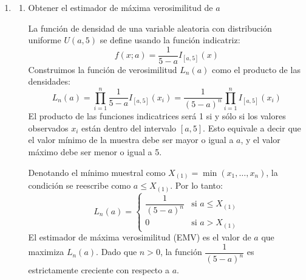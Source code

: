 \begin{enumerate}[label=\color{red}\textbf{\arabic*)}]
\begin{enumerate}[label=\arabic*)]
		            Para encontrar el máximo de esta función, calculamos la derivada de la log-verosimilitud con respecto al parámetro $\theta$ y la igualamos a cero: \[
			            \frac{\partial }{\partial \theta} \ln L_n(\theta)=\dfrac{n}{\theta}-\sum_{i=1}^{n} \ln(1+x_i)=0
		            \]
		            Despejamos $\theta$: \[
			            \dfrac{n}{\theta}=\sum_{i=1}^{n} \ln(1+x_i)
		            \]
		            Invertimos la expresión o pasamos $\theta$ multiplicando y la suma dividiendo: \[
			            \theta=\dfrac{n}{\sum_{i=1}^{n} \ln(1+x_i)}
		            \]
	      \end{enumerate}
	      \textbf{Conclusión}

	      Por lo tanto, el estimador de máxima verosimilitud para el parámetro $\theta$ es: \[
		      \hat{\theta}_{EMV}=\dfrac{n}{\sum_{i=1}^{n} \ln(1+X_i)}
	      \]

	\item {}
	      \begin{enumerate}[label=\arabic*)]
		      \item Obtener el estimador de máxima verosimilitud de $a$

		            La función de densidad de una variable aleatoria con distribución uniforme $U(a,5)$ se define usando la función indicatriz: \[
			            f(x;a)=\dfrac{1}{5-a}I_{[a,5]}(x)
		            \]
		            Construimos la función de verosimilitud $L_n(a)$ como el producto de las densidades: \[
			            L_n(a)=\prod_{i=1}^{n} \dfrac{1}{5-a}I_{[a,5]}(x_i)=\dfrac{1}{(5-a)^n}\prod_{i=1}^{n} I_{[a,5]}(x_i)
		            \]
		            El producto de las funciones indicatrices será 1 si y sólo si los valores observados $x_i$ están dentro del intervalo $[a,5]$. Esto equivale a decir que el valor mínimo de la muestra debe ser mayor o igual a $a$, y el valor máximo debe ser menor o igual a 5.

		            Denotando el mínimo muestral como $X_{(1)}=\min(x_1,\dots,x_n)$, la condición se reescribe como $a\le X_{(1)}$. Por lo tanto: \[
			            L_n(a)=\begin{cases}
				            \dfrac{1}{(5-a)^n} & \text{si }a\le X_{(1)} \\
				            0                  & \text{si }a>X_{(1)}
			            \end{cases}
		            \]
		            El estimador de máxima verosimilitud (EMV) es el valor de $a$ que maximiza $L_n(a)$. Dado que $n>0$, la función $\dfrac{1}{(5-a)^n}$ es estrictamente creciente con respecto a $a$.


\end{enumerate}
\end{enumerate}
